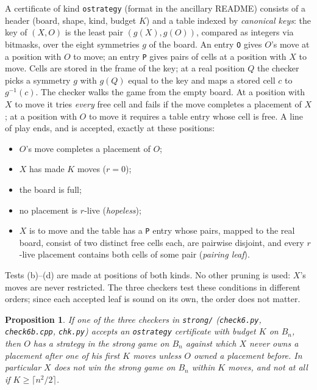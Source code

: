 \documentclass[11pt]{article}
\newtheorem{proposition}[theorem]{Proposition}
\theoremstyle{definition}
\theoremstyle{remark}
\newcommand{\file}[1]{\texttt{#1}}
\begin{document}
A certificate of kind \texttt{ostrategy} (format in the ancillary README) consists of a header
(board, shape, kind, budget $K$) and a table indexed by \emph{canonical keys}: the key of $(X,O)$ is
the least pair $(g(X),g(O))$, compared as integers via bitmasks, over the eight symmetries $g$ of
the board. An entry \texttt{O} gives $O$'s move at a position with $O$ to move; an entry \texttt{P}
gives pairs of cells at a position with $X$ to move. Cells are stored in the frame of the key; at a
real position $Q$ the checker picks a symmetry $g$ with $g(Q)$ equal to the key and maps a stored
cell $c$ to $g^{-1}(c)$. The checker walks the game from the empty board. At a position with $X$ to
move it tries \emph{every} free cell and fails if the move completes a placement of $X$; at a
position with $O$ to move it requires a table entry whose cell is free. A line of play ends, and is
accepted, exactly at these positions:
\begin{itemize}
\item[(a)] $O$'s move completes a placement of $O$;
\item[(b)] $X$ has made $K$ moves ($r=0$);
\item[(c)] the board is full;
\item[(d)] no placement is $r$-live (\emph{hopeless});
\item[(e)] $X$ is to move and the table has a \texttt{P} entry whose pairs, mapped to the real
board, consist of two distinct free cells each, are pairwise disjoint, and every $r$-live placement
contains both cells of some pair (\emph{pairing leaf}).
\end{itemize}
Tests (b)--(d) are made at positions of both kinds. No other pruning is used: $X$'s moves are never
restricted. The three checkers test these conditions in different orders; since each accepted leaf
is sound on its own, the order does not matter.

\begin{proposition}\label{prop:ostrat}
If one of the three checkers in \file{strong/} (\file{check6.py}, \file{check6b.cpp},
\file{chk.py}) accepts an \texttt{ostrategy} certificate with budget $K$ on $B_n$, then $O$ has a strategy in the
strong game on $B_n$ against which $X$ never owns a placement after one of his first $K$ moves
unless $O$ owned a placement before. In particular $X$ does not win the strong game on $B_n$ within
$K$ moves, and not at all if $K\ge \lceil n^2/2\rceil$.
\end{proposition}
\end{document}
